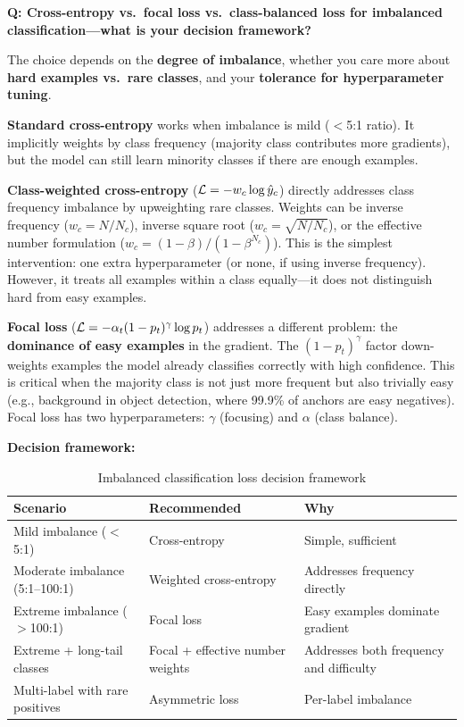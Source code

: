 \begin{interviewq}
\textbf{Q: Cross-entropy vs.\ focal loss vs.\ class-balanced loss for imbalanced classification---what is your decision framework?}

 \quad {} \quad \badgefreq{\freqhigh}

\stronganswer The choice depends on the \textbf{degree of imbalance}, whether you care more about \textbf{hard examples vs.\ rare classes}, and your \textbf{tolerance for hyperparameter tuning}.

\textbf{Standard cross-entropy} works when imbalance is mild ($<$5:1 ratio). It implicitly weights by class frequency (majority class contributes more gradients), but the model can still learn minority classes if there are enough examples.

\textbf{Class-weighted cross-entropy} ($\mathcal{L} = -w_c \log \hat{y}_c$) directly addresses class frequency imbalance by upweighting rare classes. Weights can be inverse frequency ($w_c = N/N_c$), inverse square root ($w_c = \sqrt{N/N_c}$), or the effective number formulation ($w_c = (1-\beta)/(1-\beta^{N_c})$). This is the simplest intervention: one extra hyperparameter (or none, if using inverse frequency). However, it treats all examples within a class equally---it does not distinguish hard from easy examples.

\textbf{Focal loss} ($\mathcal{L} = -\alpha_t(1-p_t)^\gamma \log p_t$) addresses a different problem: the \textbf{dominance of easy examples} in the gradient. The $(1-p_t)^\gamma$ factor down-weights examples the model already classifies correctly with high confidence. This is critical when the majority class is not just more frequent but also trivially easy (e.g., background in object detection, where 99.9\% of anchors are easy negatives). Focal loss has two hyperparameters: $\gamma$ (focusing) and $\alpha$ (class balance).

\textbf{Decision framework:}
\begin{table}[H]
\centering
\caption{Imbalanced classification loss decision framework}
\begin{tabularx}{\textwidth}{lXX}
\toprule
\textbf{Scenario} & \textbf{Recommended} & \textbf{Why} \\
\midrule
Mild imbalance ($<$5:1) & Cross-entropy & Simple, sufficient \\
Moderate imbalance (5:1--100:1) & Weighted cross-entropy & Addresses frequency directly \\
Extreme imbalance ($>$100:1) & Focal loss & Easy examples dominate gradient \\
Extreme + long-tail classes & Focal + effective number weights & Addresses both frequency and difficulty \\
Multi-label with rare positives & Asymmetric loss & Per-label imbalance \\
\bottomrule
\end{tabularx}
\end{table}


\end{interviewq}
